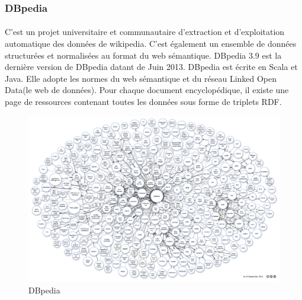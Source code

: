 \documentclass[12pt,a4	]{report}
\begin{document}
\subsubsection*{DBpedia}
\paragraph{}
C'est un projet universitaire et communautaire d’extraction et d’exploitation automatique des données de wikipedia. C’est également un ensemble de données structurées et normalisées au format du web sémantique.
DBpedia 3.9 est la dernière version de DBpedia datant de Juin 2013. DBpedia est écrite en Scala et Java.
Elle adopte les normes du web sémantique et du réseau Linked Open Data(le web de données). Pour chaque document encyclopédique, il existe une page de ressources contenant toutes les données sous forme de triplets RDF.
\begin{figure}[H]
        \centering
                \centering
                \includegraphics[width=15cm]{dbpedia.png}
               \caption{DBpedia}

\end{figure}
\end{document}
